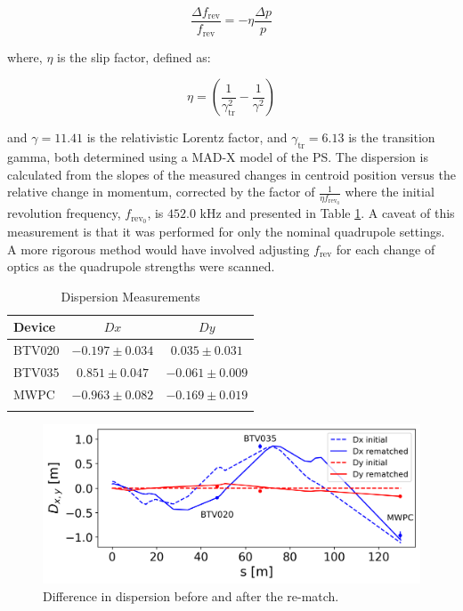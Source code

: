 \documentclass[a4paper,
               biblatex,     %
               ]{jacow}
\begin{document}
\begin{equation}
\frac{\Delta f_{\text{rev}}}{f_{\text{rev}}} = -\eta \frac{\Delta p}{p}
\end{equation}

\noindent where, $\eta$ is the slip factor, defined as:

\begin{equation}
\eta = \left(\frac{1}{\gamma_{\text{tr}}^{2}} - \frac{1}{\gamma^{2}}\right)
\end{equation}

\noindent and $\gamma = 11.41$ is the relativistic Lorentz factor, and $\gamma_{\text{tr}} = 6.13$ is the transition gamma, both determined using a MAD-X \cite{noauthor_mad_nodate} model of the PS. The dispersion is calculated from the slopes of the measured changes in centroid position versus the relative change in momentum, corrected by the factor of $\frac{1}{\eta f_{\text{rev}_0}}$ where the initial revolution frequency, $f_{\text{rev}_0}$, is $452.0$ kHz and presented in Table \ref{tab:dispersion}. A caveat of this measurement is that it was performed for only the nominal quadrupole settings. A more rigorous method would have involved adjusting $f_{\text{rev}}$ for each change of optics as the quadrupole strengths were scanned.

\begin{table}[h!]
\centering
\caption{Dispersion Measurements}
\begin{tabular}{l c c}
\hline
Device & \(Dx\) & \(Dy\) \\
\hline
BTV020  & \(-0.197 \pm 0.034\) & \(0.035 \pm 0.031\) \\
BTV035  & \(0.851 \pm 0.047\) & \(-0.061 \pm 0.009\) \\
MWPC   & \(-0.963 \pm 0.082\) & \(-0.169 \pm 0.019\) \\
\hline
\label{tab:dispersion}
\end{tabular}
\end{table}

\begin{figure}[!htb]
   \centering
   \includegraphics*[width=1.0\columnwidth]{THPR032_f1.png}
   \caption{Difference in dispersion before and after the re-match.}
   \label{fig:dispersion}
\end{figure}
\end{document}
